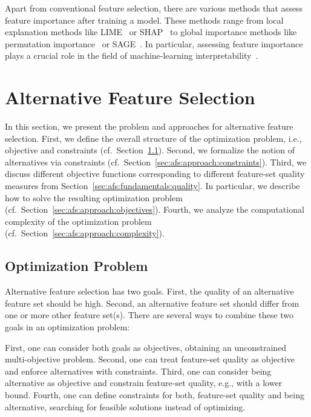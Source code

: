 \documentclass{article}
\theoremstyle{definition}
\begin{document}
Apart from conventional feature selection, there are various methods that assess feature importance after training a model.
These methods range from local explanation methods like LIME~\cite{ribeiro2016should} or SHAP~\cite{lundberg2017unified} to global importance methods like permutation importance~\cite{breiman2001random} or SAGE~\cite{covert2020understanding}.
In particular, assessing feature importance plays a crucial role in the field of machine-learning interpretability~\cite{carvalho2019machine, molnar2020interpretable}.

\section{Alternative Feature Selection}
\label{sec:afs:approach}

In this section, we present the problem and approaches for alternative feature selection.
First, we define the overall structure of the optimization problem, i.e., objective and constraints (cf.~Section~\ref{sec:afs:approach:problem}).
Second, we formalize the notion of alternatives via constraints (cf.~Section~\ref{sec:afs:approach:constraints}).
Third, we discuss different objective functions corresponding to different feature-set quality measures from Section~\ref{sec:afs:fundamentals:quality}.
In particular, we describe how to solve the resulting optimization problem (cf.~Section~\ref{sec:afs:approach:objectives}).
Fourth, we analyze the computational complexity of the optimization problem (cf.~Section~\ref{sec:afs:approach:complexity}).

\subsection{Optimization Problem}
\label{sec:afs:approach:problem}

Alternative feature selection has two goals.
First, the quality of an alternative feature set should be high.
Second, an alternative feature set should differ from one or more other feature set(s).
There are several ways to combine these two goals in an optimization problem:

First, one can consider both goals as objectives, obtaining an unconstrained multi-objective problem.
Second, one can treat feature-set quality as objective and enforce alternatives with constraints.
Third, one can consider being alternative as objective and constrain feature-set quality, e.g., with a lower bound.
Fourth, one can define constraints for both, feature-set quality and being alternative, searching for feasible solutions instead of optimizing.
\end{document}
